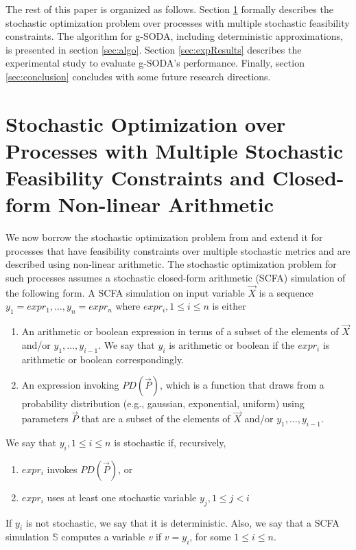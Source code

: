 \documentclass[a4paper, 12pt]{article} %
\begin{document}
The rest of this paper is organized as follows. Section \ref{sec:prob} formally describes the stochastic optimization problem over processes with multiple stochastic feasibility constraints. The algorithm for g-SODA, including deterministic approximations, is presented in section \ref{sec:algo}. Section \ref{sec:expResults} describes the experimental study to evaluate g-SODA's performance. Finally, section \ref{sec:conclusion} concludes with some future research directions. 


\section{Stochastic Optimization over Processes with Multiple Stochastic Feasibility Constraints and Closed-form Non-linear Arithmetic}
\label{sec:prob}

We now borrow the stochastic optimization problem from \cite{GMU-CS-TR-2017-3} and extend it for  processes that have feasibility constraints over multiple stochastic metrics and are described using non-linear arithmetic.
The stochastic optimization problem for such processes assumes a stochastic closed-form arithmetic (SCFA) simulation of the following form.
A SCFA simulation on input variable $\vec{X}$ is a sequence $y_1=expr_1,\dots,y_n=expr_n$
\newline where $expr_i, 1\le i \le n$ is either
\begin{enumerate}[label=(\alph*)]
	\item An arithmetic or boolean expression in terms of a subset of the elements of $\vec{X}$ and/or $y_1,\dots,y_{i-1}$. We say that $y_i$ is arithmetic or boolean if the $expr_i$ is arithmetic or boolean correspondingly.
	\item An expression invoking $PD(\vec{P})$, which is a function that draws from a probability distribution (e.g., gaussian, exponential, uniform) using parameters $\vec{P}$ that are a subset of the elements of $\vec{X}$ and/or $y_1,\dots,y_{i-1}$.
\end{enumerate}
We say that $y_i, 1\le i \le n$ is stochastic if, recursively,
\begin{enumerate}[label=(\alph*)]
	\item $expr_i$ invokes $PD(\vec{P})$, or
	\item $expr_i$ uses at least one stochastic variable $y_j, 1\le j < i$
\end{enumerate}
If $y_i$ is not stochastic, we say that it is deterministic.
Also, we say that a SCFA simulation $\mathbb{S}$  computes a variable \textit{v} if $v=y_i$, for some $1\le i \le n$.
\end{document}

